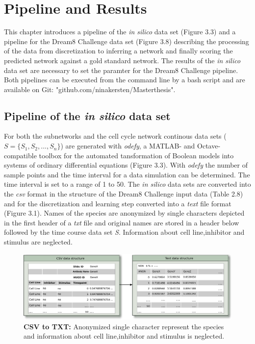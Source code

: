 \chapter{Pipeline and Results}
This chapter introduces a pipeline of the \textit{in silico} data set (Figure 3.3) and a pipeline for the Dream8 Challenge data set (Figure 3.8) describing the processing of the data from discretization to inferring a network and finally scoring the predicted network against a gold standard network. The results of the \textit{in silico} data set are necessary to set the paramter for the Dream8 Challenge pipeline. Both pipelines can be executed from the command line by a bash script and are available on Git: "github.com/ninakersten/Masterthesis". 

\section{Pipeline of the \textit{in silico} data set}

For both the subnetworks and the cell cycle network continous data sets ($S=\{ S_{1},S_{2},...,S_{n}\} $) are generated with \textit{odefy}, a MATLAB- and Octave-compatible toolbox for the automated tansformation of Boolean models into systems of ordinary differential equations \citep{Krumsiek2010} (Figure 3.3). With \textit{odefy} the number of sample points and the time interval for a data simulation can be determined. The time interval is set to a range of 1 to 50. The \textit{in silico} data sets are converted into the \textit{csv} format in the structure of the Dream8 Challenge input data (Table 2.8) and for the discretization and learning step converted into a \textit{text} file format (Figure 3.1). Names of the species are anonymized by single characters depicted in the first header of a \textit{txt} file and original names are stored in a header below followed by the time course data set \textit{S}. Information about cell line,inhibitor and stimulus are neglected.


\begin{figure}[H]
\captionsetup{width=1.0\linewidth}
\centering
\includegraphics[width=1.0\textwidth]{./Bilder/CSV2TXT.pdf}
\caption[CSV to TXT]{\textbf{CSV to TXT:} Anonymized single character represent the species and information about cell line,inhibitor and stimulus is neglected. }
\label{fig:9}
\end{figure}


